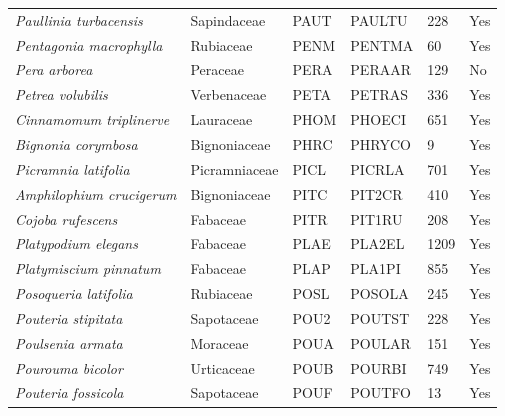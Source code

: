 \documentclass[11pt]{article}
\begin{document}
\begin{longtable}{@{}llllll@{}}
\textit{Paullinia turbacensis}                        & Sapindaceae      & PAUT   & PAULTU & 228             & Yes       \\
\textit{Pentagonia macrophylla}                       & Rubiaceae        & PENM   & PENTMA & 60              & Yes       \\
\textit{Pera arborea}                                 & Peraceae         & PERA   & PERAAR & 129             & No        \\
\textit{Petrea volubilis}                             & Verbenaceae      & PETA   & PETRAS & 336             & Yes       \\
\textit{Cinnamomum triplinerve}                       & Lauraceae        & PHOM   & PHOECI & 651             & Yes       \\
\textit{Bignonia corymbosa}                           & Bignoniaceae     & PHRC   & PHRYCO & 9               & Yes       \\
\textit{Picramnia latifolia}                          & Picramniaceae    & PICL   & PICRLA & 701             & Yes       \\
\textit{Amphilophium crucigerum}                      & Bignoniaceae     & PITC   & PIT2CR & 410             & Yes       \\
\textit{Cojoba rufescens}                             & Fabaceae         & PITR   & PIT1RU & 208             & Yes       \\
\textit{Platypodium elegans}                          & Fabaceae         & PLAE   & PLA2EL & 1209            & Yes       \\
\textit{Platymiscium pinnatum}                        & Fabaceae         & PLAP   & PLA1PI & 855             & Yes       \\
\textit{Posoqueria latifolia}                         & Rubiaceae        & POSL   & POSOLA & 245             & Yes       \\
\textit{Pouteria stipitata}                           & Sapotaceae       & POU2   & POUTST & 228             & Yes       \\
\textit{Poulsenia armata}                             & Moraceae         & POUA   & POULAR & 151             & Yes       \\
\textit{Pourouma bicolor}                             & Urticaceae       & POUB   & POURBI & 749             & Yes       \\
\textit{Pouteria fossicola}                           & Sapotaceae       & POUF   & POUTFO & 13              & Yes       \\

\end{longtable}
\end{document}
